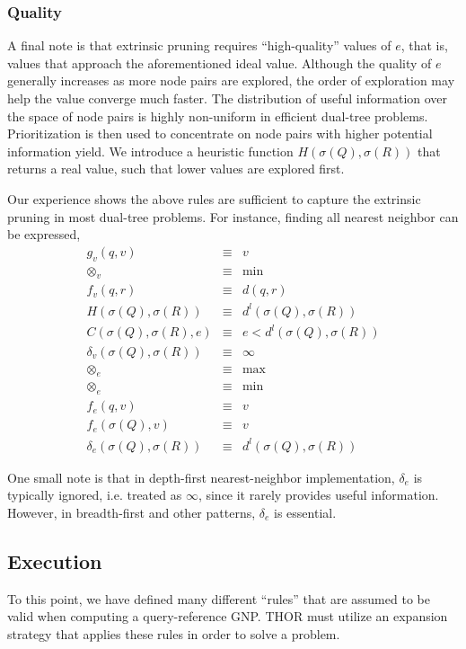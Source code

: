 \documentclass[twoside,leqno,twocolumn]{article}
\newcommand{\summary}{\delta}
\newcommand{\mysubsub}[1]{\subsubsection{#1} }
\newcommand{\lo}[1]{#1^{l}}
\newcommand{\distlo}{\lo{d}}
\newcommand{\dist}[2]{d(#1,#2)}
\newcommand{\nameop}[2]{#1_{\!#2}}
\newcommand{\myop}[1]{\nameop{\otimes}{#1}}
\newcommand{\letterqr}{v}
\newcommand{\inqr}{v}
\newcommand{\opqr}{\myop{\letterqr}}
\newcommand{\fqr}{f_{\letterqr}}
\newcommand{\gqr}{g_{\letterqr}}
\newcommand{\letterqrv}{v}
\newcommand{\deltaqrv}{\summary_{\letterqrv}}
\newcommand{\lettermu}{e}
\newcommand{\inmu}{e}
\newcommand{\outopmu}{\myop{\lettermu}}
\newcommand{\opmu}{\myop{\lettermu}}
\newcommand{\fmu}{f_{\lettermu}}
\newcommand{\fmuv}{f_{\lettermu}}
\newcommand{\deltamu}{\summary_{\lettermu}}
\newcommand{\canprunemu}{C}
\newcommand{\heurqr}{H}
\newcommand{\outstat}{\sigma}
\begin{document}
\mysubsub{Quality}
A final note is that extrinsic pruning requires ``high-quality'' values of $\inmu$, that is, values that approach the aforementioned ideal value.
Although the quality of $\lettermu$ generally increases as more node pairs are explored, the order of exploration may help the value converge much faster.
The distribution of useful information over the space of node pairs is highly non-uniform in efficient dual-tree problems.
Prioritization is then used to concentrate on node pairs with higher potential information yield.
We introduce a heuristic function $\heurqr(\outstat(Q),\outstat(R))$ that returns a real value, such that lower values are explored first.

Our experience shows the above rules are sufficient to capture the extrinsic pruning in most dual-tree problems.
For instance, finding all nearest neighbor can be expressed,
\begin{eqnarray*}
\gqr(q, \inqr) &\equiv& \inqr
\\
\opqr &\equiv& \min
\\
\fqr(q,r) &\equiv& \dist{q}{r}
\\
\heurqr(\outstat(Q),\outstat(R)) &\equiv& \distlo(\outstat(Q), \outstat(R))
\\
\canprunemu(\outstat(Q), \outstat(R), \lettermu)
 &\equiv& \lettermu < \distlo(\outstat(Q), \outstat(R))
\\
\deltaqrv(\outstat(Q),\outstat(R)) &\equiv& \infty
\\
\outopmu &\equiv& \max
\\
\opmu &\equiv& \min
\\
\fmu(q, \letterqr) &\equiv& \letterqr
\\
\fmuv(\outstat(Q), \letterqrv) &\equiv& \letterqrv
\\
\deltamu(\outstat(Q),\outstat(R)) &\equiv& \distlo(\outstat(Q),\outstat(R))
\end{eqnarray*}

\noindent One small note is that in depth-first nearest-neighbor implementation, $\deltamu$ is typically ignored, i.e. treated as $\infty$, since it rarely provides useful information.
However, in breadth-first and other patterns, $\deltamu$ is essential.

\subsection{Execution}

To this point, we have defined many different ``rules'' that are assumed to be valid when computing a query-reference GNP.
THOR must utilize an expansion strategy that applies these rules in order to solve a problem.
\end{document}

